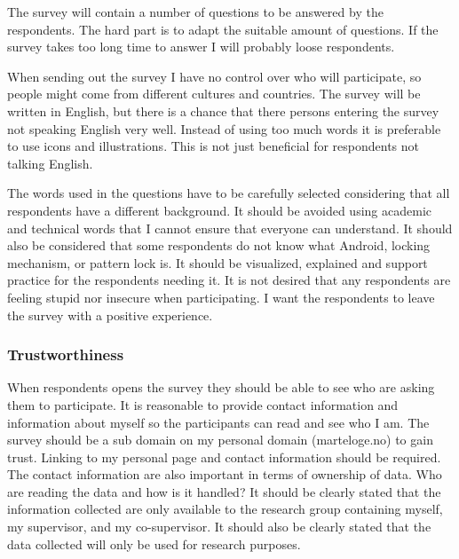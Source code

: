      The survey will contain a number of questions to be answered by the respondents. The hard part is to adapt the suitable amount of questions. If the survey takes too long time to answer I will probably loose respondents.

      When sending out the survey I have no control over who will participate, so people might come from different cultures and countries. The survey will be written in English, but there is a chance that there persons entering the survey not speaking English very well. Instead of using too much words it is preferable to use icons and illustrations. This is not just beneficial for respondents not talking English.

      The words used in the questions have to be carefully selected considering that all respondents have a different background. It should be avoided using academic and technical words that I cannot ensure that everyone can understand. It should also be considered that some respondents do not know what Android, locking mechanism, or pattern lock is. It should be visualized, explained and support practice for the respondents needing it. It is not desired that any respondents are feeling stupid nor insecure when participating. I want the respondents to leave the survey with a positive experience. 


    \subsubsection*{Trustworthiness}
      When respondents opens the survey they should be able to see who are asking them to participate. It is reasonable to provide contact information and information about myself so the participants can read and see who I am. The survey should be a sub domain on my personal domain (marteloge.no) to gain trust. Linking to my personal page and contact information should be required.
      The contact information are also important in terms of ownership of data. Who are reading the data and how is it handled? It should be clearly stated that the information collected are only available to the research group containing myself, my supervisor, and my co-supervisor. It should also be clearly stated that the data collected will only be used for research purposes.

